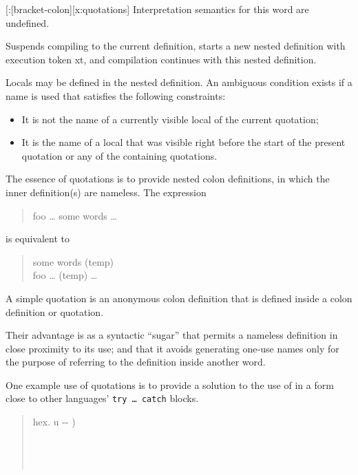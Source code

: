 \begin{worddef}{}{[:}[bracket-colon][x:quotations]
\interpret
	Interpretation semantics for this word are undefined.

\compile

	Suspends compiling to the current definition, starts a new nested
	definition with execution token xt, and compilation continues with
	this nested definition.

	Locals may be defined in the nested definition.  An ambiguous
	condition exists if a name is used that satisfies the following
	constraints:
	\begin{itemize}
	\item It is not the name of a currently visible local of the current
		quotation;
	\item It is the name of a local that was visible right before the start
		of the present quotation or any of the containing quotations.
	\end{itemize} 

	\walso{tools:;]}

	\begin{rationale}
		The essence of quotations is to provide nested colon definitions,
		in which the inner definition(s) are nameless. The expression
		\begin{quote}\ttfamily
			\word{:} foo {\ldots} \word{[:} some words \word{;]} {\ldots} \word{;}
		\end{quote}
		is equivalent to
		\begin{quote}\ttfamily
			 some words \word{;}  (temp) \\
			\word{:} foo {\ldots} (temp) {\ldots} \word{;}
		\end{quote}

		A simple quotation is an anonymous colon definition that is defined
		inside a colon definition or quotation.

		Their advantage is as a syntactic ``sugar'' that permits a nameless
		definition in close proximity to its use; and that it avoids generating
		one-use names only for the purpose of referring to the definition
		inside another word.

		One example use of quotations is to provide a solution to the use
		of  in a form close to other languages'
		\texttt{try {\ldots} catch} blocks.

		\begin{quote}\ttfamily
		\word{:} hex.  u -{}- ) \\
		\tab {}   \\
		\tab \word{[:}   \word{;]}  \\
		\tab {}  \word{!}  \\
		\word{;}
		\end{quote}


\end{rationale}
\end{worddef}
